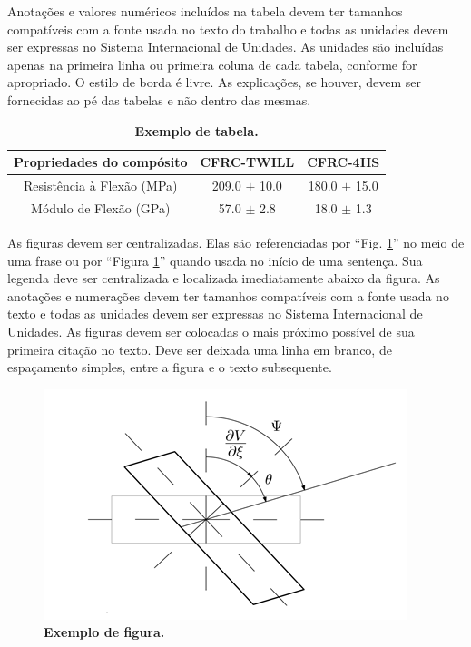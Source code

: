 \documentclass[10pt,fleqn,a4paper,twoside]{article}
\begin{document}
        Anotações e valores numéricos incluídos na tabela devem ter tamanhos compatíveis com a fonte usada no texto do trabalho e todas as unidades devem ser expressas no Sistema Internacional de Unidades. As unidades são incluídas apenas na primeira linha ou primeira coluna de cada tabela, conforme for apropriado. O estilo de borda é livre. As explicações, se houver, devem ser fornecidas ao pé das tabelas e não dentro das mesmas.

        \begin{table}[ht]
            \begin{center}
                \caption{\textbf{Exemplo de tabela.}}
                    \begin{tabular}{c|c|c}
                    \hline
                    Propriedades do compósito       & CFRC-TWILL        & CFRC-4HS         \\
                    \hline
                    Resistência à Flexão  (MPa)     & 209.0 $\pm$ 10.0       & 180.0 $\pm$  15.0    \\
                    \hline
                    Módulo de Flexão  (GPa)         & 57.0 $\pm$ 2.8    & 18.0 $\pm$  1.3  \\
                    \hline
                    \end{tabular} \label{tab:tabexemplo}
            \end{center}
        \end{table}

        As figuras devem ser centralizadas. Elas são referenciadas por ``Fig. \ref{fig:figexemplo}'' no meio de uma frase ou por ``Figura \ref{fig:figexemplo}'' quando usada no início de uma sentença. Sua legenda deve ser centralizada e localizada imediatamente abaixo da figura. As anotações e numerações devem ter tamanhos compatíveis com a fonte usada no texto e todas as unidades devem ser expressas no Sistema Internacional de Unidades. As figuras devem ser colocadas o mais próximo possível de sua primeira citação no texto. Deve ser deixada uma linha em branco, de espaçamento simples, entre a figura e o texto subsequente.
    
        \begin{figure}[h]
            \begin{center}
                \includegraphics[angle=0, scale=.8]{figura.png}
            \end{center}
            \caption{\textbf{Exemplo de figura.}}
            \label{fig:figexemplo}
        \end{figure}
\end{document}
